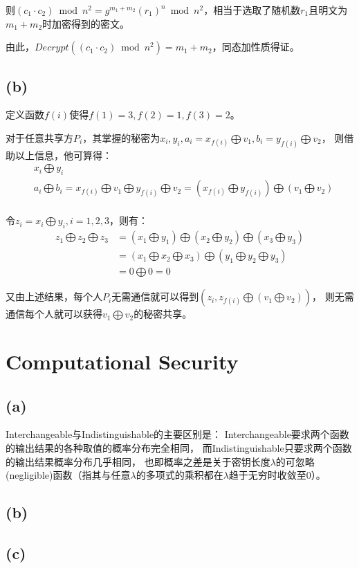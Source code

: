 \documentclass[twoside,11pt]{article}
\begin{document}
则$(c_1 \cdot c_2) \bmod{n^2}=g^{m_1+m_2} (r_1)^{n} \bmod{n^2}$，相当于选取了随机数$r_1$且明文为$m_1+m_2$时加密得到的密文。

由此，$Decrypt( (c_1 \cdot c_2) \bmod{n^2} ) =m_1+m_2$，同态加性质得证。

\subsection*{(b)}
定义函数$f(i)$使得$f(1)=3, f(2)=1, f(3)=2$。

对于任意共享方$P_i$，其掌握的秘密为$x_i, y_i, a_i=x_{f(i)} \bigoplus v_1, b_i=y_{f(i)} \bigoplus v_2$，
则借助以上信息，他可算得：
\begin{align*}
     & x_i \bigoplus y_i                                                              \\
     & a_i \bigoplus b_i =  x_{f(i)} \bigoplus v_1 \bigoplus y_{f(i)} \bigoplus v_2 =
    (x_{f(i)} \bigoplus y_{f(i)}) \bigoplus (v_1 \bigoplus v_2)                       \\
\end{align*}

令$z_i = x_i \bigoplus y_i, i=1,2,3$，则有：
\begin{align*}
    z_1 \bigoplus z_2 \bigoplus z_3 & = (x_1 \bigoplus y_1) \bigoplus (x_2 \bigoplus y_2) \bigoplus (x_3 \bigoplus y_3) \\
                                    & = (x_1 \bigoplus x_2 \bigoplus x_3) \bigoplus (y_1 \bigoplus y_2 \bigoplus y_3) \\
                                    & = 0 \bigoplus 0 = 0
\end{align*}

又由上述结果，每个人$P_i$无需通信就可以得到$(z_i, z_{f(i)} \bigoplus (v_1 \bigoplus v_2))$，
则无需通信每个人就可以获得$v_1 \bigoplus v_2$的秘密共享。


\section{Computational Security}
\subsection*{(a)}
Interchangeable与Indistinguishable的主要区别是：
Interchangeable要求两个函数的输出结果的各种取值的概率分布完全相同，
而Indistinguishable只要求两个函数的输出结果概率分布几乎相同，
也即概率之差是关于密钥长度$\lambda$的可忽略(negligible)函数（指其与任意$\lambda$的多项式的乘积都在$\lambda$趋于无穷时收敛至0）。

\subsection*{(b)}


\subsection*{(c)}
\end{document}
